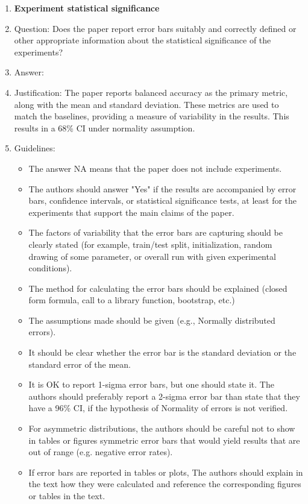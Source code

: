\documentclass{article}
\begin{document}
\begin{enumerate}
\item {\bf Experiment statistical significance}
    \item[] Question: Does the paper report error bars suitably and correctly defined or other appropriate information about the statistical significance of the experiments?
    \item[] Answer: \answerYes{} %
    \item[] Justification: The paper reports balanced accuracy as the primary metric, along with the mean and standard deviation. These metrics are used to match the baselines, providing a measure of variability in the results. This results in a 68\% CI under normality assumption.
    \item[] Guidelines:
    \begin{itemize}
        \item The answer NA means that the paper does not include experiments.
        \item The authors should answer "Yes" if the results are accompanied by error bars, confidence intervals, or statistical significance tests, at least for the experiments that support the main claims of the paper.
        \item The factors of variability that the error bars are capturing should be clearly stated (for example, train/test split, initialization, random drawing of some parameter, or overall run with given experimental conditions).
        \item The method for calculating the error bars should be explained (closed form formula, call to a library function, bootstrap, etc.)
        \item The assumptions made should be given (e.g., Normally distributed errors).
        \item It should be clear whether the error bar is the standard deviation or the standard error of the mean.
        \item It is OK to report 1-sigma error bars, but one should state it. The authors should preferably report a 2-sigma error bar than state that they have a 96\% CI, if the hypothesis of Normality of errors is not verified.
        \item For asymmetric distributions, the authors should be careful not to show in tables or figures symmetric error bars that would yield results that are out of range (e.g. negative error rates).
        \item If error bars are reported in tables or plots, The authors should explain in the text how they were calculated and reference the corresponding figures or tables in the text.
    \end{itemize}


\end{enumerate}
\end{document}
